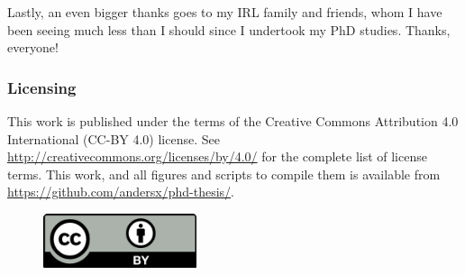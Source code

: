 Lastly, an even bigger thanks goes to my IRL family and friends, whom I have been seeing much less than I should since I undertook my PhD studies. Thanks, everyone!
\clearpage
\qquad
\vspace{15cm}
\subsubsection*{Licensing}
This work is published under the terms of the Creative Commons Attribution 4.0 International (CC-BY 4.0) license. See \url{http://creativecommons.org/licenses/by/4.0/} for the complete list of license terms.
This work, and all figures and scripts to compile them is available from \url{https://github.com/andersx/phd-thesis/}.
\begin{figure}[h!]
\centering\includegraphics[width=0.4\textwidth]{figures/cc-by.pdf}
\end{figure}
